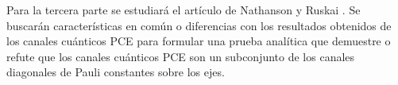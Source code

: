 Para la tercera parte se estudiará el artículo de Nathanson y Ruskai 
\cite{nathanson2007pauli}. Se buscarán características en común 
o diferencias con los resultados obtenidos de los canales cuánticos PCE
para formular una prueba analítica que demuestre o refute que los 
canales cuánticos PCE son un subconjunto de los canales diagonales 
de Pauli constantes sobre los ejes.

%
%
%


